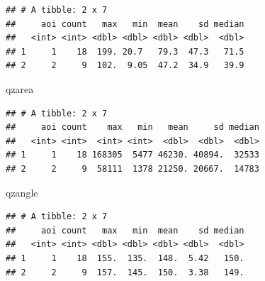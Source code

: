 \documentclass[
]{article}
\newenvironment{Shaded}{\begin{snugshade}}{\end{snugshade}}
\newcommand{\NormalTok}[1]{#1}
\begin{document}
\begin{verbatim}
## # A tibble: 2 x 7
##     aoi count   max   min  mean    sd median
##   <int> <int> <dbl> <dbl> <dbl> <dbl>  <dbl>
## 1     1    18  199. 20.7   79.3  47.3   71.5
## 2     2     9  102.  9.05  47.2  34.9   39.9
\end{verbatim}

\begin{Shaded}
\begin{Highlighting}[]
\NormalTok{qzarea}
\end{Highlighting}
\end{Shaded}

\begin{verbatim}
## # A tibble: 2 x 7
##     aoi count    max   min   mean     sd median
##   <int> <int>  <int> <int>  <dbl>  <dbl>  <dbl>
## 1     1    18 168305  5477 46230. 40894.  32533
## 2     2     9  58111  1378 21250. 20667.  14783
\end{verbatim}

\begin{Shaded}
\begin{Highlighting}[]
\NormalTok{qzangle}
\end{Highlighting}
\end{Shaded}

\begin{verbatim}
## # A tibble: 2 x 7
##     aoi count   max   min  mean    sd median
##   <int> <int> <dbl> <dbl> <dbl> <dbl>  <dbl>
## 1     1    18  155.  135.  148.  5.42   150.
## 2     2     9  157.  145.  150.  3.38   149.
\end{verbatim}
\end{document}
